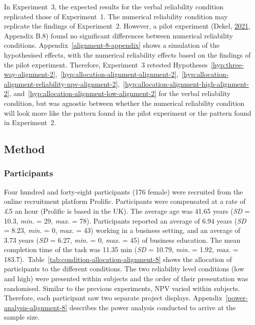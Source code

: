 \documentclass[
  english,
  man, donotrepeattitle,floatsintext]{apa7}
\theoremstyle{definition}
\theoremstyle{definition}
\theoremstyle{definition}
\theoremstyle{definition}
\theoremstyle{remark}
\begin{document}
In Experiment~3, the expected results for the verbal reliability condition
replicated those of Experiment~1. The numerical reliability condition may
replicate the findings of Experiment~2. However, a pilot experiment
(Dekel, \protect\hyperlink{ref-dekel2021b}{2021}, Appendix B.8) found no significant differences between numerical
reliability conditions. Appendix~\ref{alignment-8-appendix} shows a simulation
of the hypothesised effects, with the numerical reliability effects based on the
findings of the pilot experiment. Therefore, Experiment~3 retested
Hypotheses~\ref{hyp:three-way-alignment-2},~\ref{hyp:allocation-alignment-alignment-2},~\ref{hyp:allocation-alignment-reliability-npv-alignment-2},~\ref{hyp:allocation-alignment-high-alignment-2},
and~\ref{hyp:allocation-alignment-low-alignment-2} for the verbal reliability
condition, but was agnostic between whether the numerical reliability condition
will look more like the pattern found in the pilot experiment or the pattern
found in Experiment~2.

\hypertarget{method-1}{%
\subsection{Method}\label{method-1}}

\hypertarget{participants-2}{%
\subsubsection{Participants}\label{participants-2}}

Four hundred and forty-eight participants (176 female) were recruited from the online recruitment platform Prolific. Participants were compensated at a rate of \pounds 5 an hour (Prolific is based in the UK). The average age was 41.65 years (\emph{SD} = 10.3, \emph{min.} = 29, \emph{max.} = 78). Participants reported an average of 6.94 years (\emph{SD} = 8.23, \emph{min.} = 0, \emph{max.} = 43) working in a business setting, and an average of 3.73 years (\emph{SD} = 6.27, \emph{min.} = 0, \emph{max.} = 45) of business education. The mean completion time of the task was 11.35 min (\emph{SD} = 10.79, \emph{min.} = 1.92, \emph{max.} = 183.7).~Table~\ref{tab:condition-allocation-alignment-8}
shows the allocation of participants to the different conditions. The two
reliability level conditions (low and high) were presented within subjects and
the order of their presentation was randomised. Similar to the previous
experiments, NPV varied within subjects. Therefore, each participant saw two
separate project displays. Appendix~\ref{power-analysis-alignment-8} describes
the power analysis conducted to arrive at the sample size.
\end{document}
